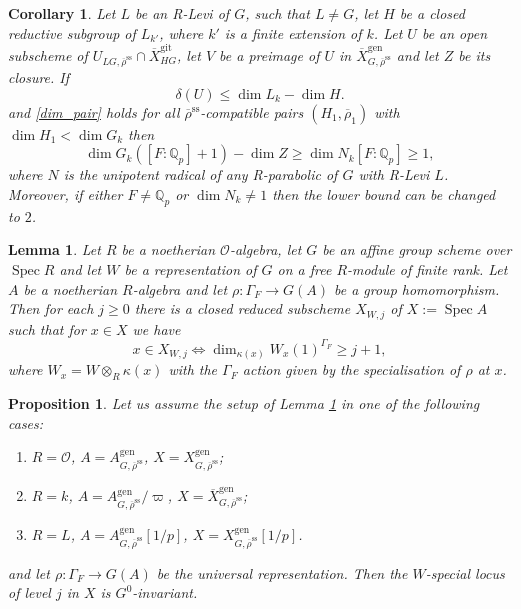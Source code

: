 \documentclass[10pt,a4paper]{amsart}
\newtheorem{lem}{Lemma}
\newtheorem{cor}{Corollary}
\newtheorem{prop}{Proposition}
\newcommand{\OO}{\mathcal O}
\newcommand{\Qp}{\mathbb {Q}_p}
\DeclareMathOperator{\Spec}{Spec}
\newcommand{\Xbar}{\overline{X}}
\newcommand{\XgenGrhobarss}{X^{\gen}_{G,\rhobarss}}
\newcommand{\gen}{\mathrm{gen}}
\newcommand{\gps}{\mathrm{git}}
\newcommand{\rhobar}{\overline{\rho}}
\newcommand{\rhobarss}{\rhobar^{\mathrm{ss}}}
\begin{document}
\begin{cor}\label{bound_2} Let $L$ be an R-Levi of $G$, such that $L\neq G$, 
let $H$ be a closed reductive subgroup of $L_{k'}$, where 
$k'$ is a finite extension of $k$. Let $U$ be an open subscheme of $U_{LG, \rhobarss}\cap \Xbar^{\gps}_{HG}$, 
let $V$ be a preimage of $U$ in $\Xbar^{\gen}_{G, \rhobarss}$ and let $Z$ be its closure. 
If \begin{equation}\label{lostcount} 
 \delta(U) \le \dim L_k -\dim H.
\end{equation} and
\eqref{dim_pair} holds for all $\rhobarss$-compatible pairs $(H_1, \rhobar_1)$ with $\dim H_1< \dim G_k$ then
$$\dim G_k ([F:\Qp]+1) - \dim Z\ge \dim N_k [F:\Qp]\ge 1,$$
where $N$ is the unipotent radical of any R-parabolic of $G$ with R-Levi $L$. Moreover, 
if either $F\neq \Qp$ or $\dim N_k \neq 1$ then the lower bound can be changed to $2$. 
\end{cor}

\begin{lem}\label{V_iks} Let $R$ be a noetherian $\OO$-algebra, let $G$ be an affine group scheme 
over $\Spec R$ and let $W$ be a representation of $G$ on a free $R$-module of finite rank. 
Let $A$ be a noetherian $R$-algebra and let $\rho: \Gamma_F\rightarrow G(A)$ 
be a group homomorphism. Then for each $j\ge 0$ there is a closed reduced subscheme $X_{W, j}$ of $X:=\Spec A$ such that for 
$x\in X$ we have 
$$x\in X_{W,j}  \iff \dim_{\kappa(x)} W_x(1)^{\Gamma_F}\ge j+1,$$ where $W_x= W\otimes_{R} \kappa(x)$ with the 
$\Gamma_F$ action given by the specialisation of $\rho$ at $x$. 
\end{lem} 

\begin{prop}\label{setup} Let us assume the setup of Lemma \ref{V_iks} in one of the following cases:
\begin{enumerate}
\item $R=\OO$, $A=A^{\gen}_{G, \rhobarss}$, $X=\XgenGrhobarss$;
\item $R=k$, $A=A^{\gen}_{G, \rhobarss} /\varpi$, $X= \overline X^{\gen}_{G, \rhobarss}$;
\item $R=L$, $A= A^{\gen}_{G, \rhobarss}[1/p]$, $X= \XgenGrhobarss[1/p]$.
\end{enumerate}
and let
$\rho: \Gamma_F \rightarrow G(A)$ be the universal
representation. Then the $W$-special locus of level $j$ in $X$ is $G^0$-invariant.
\end{prop} 
\end{document}
